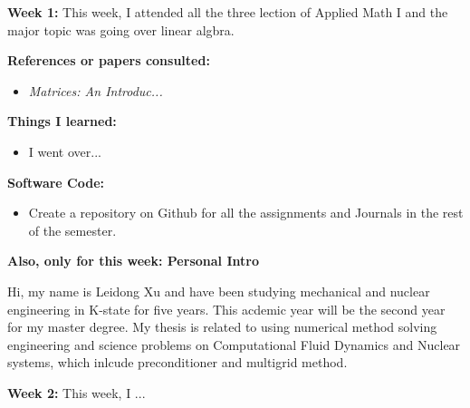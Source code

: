 \documentclass{article}
\begin{document}
\textbf{Week 1:}
This week, I attended all the three lection of Applied Math I and the major topic was going over linear algbra.

\textbf{References or papers consulted:}
\begin{itemize}
\item {\em Matrices: An Introduc...}
\end{itemize}

\textbf{Things I learned:}
\begin{itemize}
\item I went over...
\end{itemize}

\textbf{Software Code:}
 \begin{itemize}
\item Create a repository on Github for all the assignments and Journals in the rest of the semester.
\end{itemize}


\textbf{Also, only for this week: Personal Intro}

Hi, my name is Leidong Xu and have been studying mechanical and nuclear engineering in K-state for five years. This acdemic year will be the second year for my master degree. My thesis is related to using numerical method solving engineering and science problems on Computational Fluid Dynamics and Nuclear systems, which inlcude preconditioner and multigrid method.


\newpage 

\textbf{Week 2:}
This week, I ...
\end{document}
